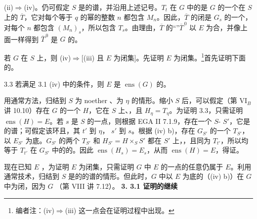 (ii)$\Rightarrow$(iv)。仍可假定 $S$ 是的谱，并沿用上述记号。$T_t$ 在 $G$ 中的是 $G$ 的一个在 $S$ 上的 $\overline T$，它对每个等于 $q$ 的幂的整数 $n$ 都包含 $M_n$。因此，$\overline T$ 的闭是 $G_s$ 的一个，对每个 $n$ 都包含 $(M_n)_s$，所以包含 $T_s$。由理由，$\overline T$ 的“”$\overline T^{\,0}$ 以 $E$ 为合，并像上面一样得到 $\overline T^{\,0}$ 是 $G$ 的。

若 $G$ 在 $S$ 上，则 (iv)$\Rightarrow$[(iii) 且 $E$ 为闭集]。先证明 $E$ 为闭集。\footnote{编者注：(iv)$\Rightarrow$(iii) 这一点会在证明过程中出现。}首先证明下面的。
\begin{SGAresult}{}{3.3}
若满足 3.1 (iv) 中的条件，则 $E$ 是 $\operatorname{ens}(G)$ 的。
\end{SGAresult}
用通常方法，归结到 $S$ 为 noether 、为 $\eta$ 的情形。缩小 $S$ 后，可以假定（第 VI$_B$ 讲 10.10）存在 $G$ 的一个 $H$，它在 $S$ 上、，且 $H_\eta=T_\eta$。为证明 3.3，只需证明 $\operatorname{ens}(H)=E$。若 $s$ 是 $S$ 的一点，则根据 EGA II 7.1.9，存在一个 $S$- $S'$，它是的谱；可假定该环且，其 $t'$ 到 $\eta$， $s'$ 到 $s$。根据 (iv) b)，存在 $G_{S'}$ 的一个 $T_{S'}$，以 $E_{S'}$ 为底。$G_{S'}$ 的两个 $T_{S'}$ 和 $H_{S'}=H\times_S S'$ 都在 $S'$ 上，，且同为 $T_{t'}$，所以均等于 $T_{t'}$ 在 $G_{S'}$ 中的的。因此 $\operatorname{ens}(H_s)=E_s$，从而 $\operatorname{ens}(H)=E$，得证。

现在已知 $E$ ，为证明 $E$ 为闭集，只需证明 $G$ 中 $E$ 的一点的任意仍属于 $E$。利用通常技术，归结到 $S$ 是的的谱的情形。但此时，$G$ 中以 $E$ 为底的（(iv) b)）在 $G$ 中为闭，因为 $G$ （第 VIII 讲 7.12）。
\textbf{3. 3.1 证明的继续}

